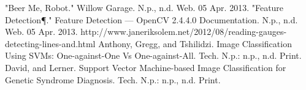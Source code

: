 \documentclass[letterpaper, 10 pt, conference]{ieeeconf}  %
\begin{document}
\begin{thebibliography}{99}

 "Beer Me, Robot." Willow Garage. N.p., n.d. Web. 05 Apr. 2013.
 "Feature Detection¶." Feature Detection — OpenCV 2.4.4.0 Documentation. N.p., n.d. Web. 05 Apr. 2013.
 http://www.janeriksolem.net/2012/08/reading-gauges-detecting-lines-and.html
 Anthony, Gregg, and Tshilidzi. Image Classification Using SVMs: One-against-One Vs One-against-All. Tech. N.p.: n.p., n.d. Print.
 David, and Lerner. Support Vector Machine-based Image Classiﬁcation for Genetic Syndrome Diagnosis. Tech. N.p.: n.p., n.d. Print.







\end{thebibliography}
\end{document}
